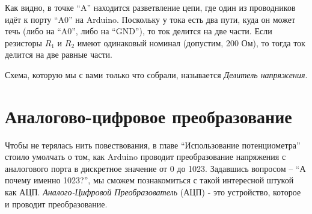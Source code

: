 \documentclass[a4paper,twoside]{book}
\begin{document}
Как видно, в точке ``A'' находится разветвление цепи, где один из проводников
идёт к порту ``A0'' на Arduino.  Поскольку у тока есть два пути, куда он может
течь (либо на ``A0'', либо на ``GND''), то ток делится на две части.  Если
резисторы $R_1$ и $R_2$ имеют одинаковый номинал (допустим, 200 Ом), то тогда
ток делится на две равные части.

Схема, которую мы с вами только что собрали, называется \emph{Делитель
напряжения}.

\section{Аналогово-цифровое преобразование}

Чтобы не терялась нить повествования, в главе ``Использование потенциометра''
стоило умолчать о том, как Arduino проводит преобразование напряжения с
аналогового порта в дискретное значение от 0 до 1023. Задавшись вопросом -- ``А
почему именно 1023?'', мы сможем познакомиться с такой интересной штукой как
АЦП. \emph{Аналого-Цифровой Преобразователь} (АЦП) - это устройство, которое и
проводит преобразование.
\end{document}
